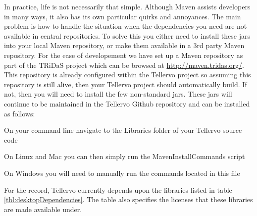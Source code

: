 In practice, life is not necessarily that simple.  Although Maven assists developers in many ways, it also has its own particular quirks and annoyances.  The main problem is how to handle the situation when the dependencies you need are not available in central repositories.  To solve this you either need to install these jars into your local Maven repository, or make them available in a 3rd party Maven repository.  For the ease of developement we have set up a Maven repository as part of the TRiDaS project which can be browsed at \url{http://maven.tridas.org/}.  This repository is already configured within the Tellervo project so assuming this repository is still alive, then your Tellervo project should automatically build.  If not, then you will need to install the few non-standard jars.  These jars will continue to be maintained in the Tellervo Github repository and can be installed as follows:

\begin{itemize*}
 \item On your command line navigate to the Libraries folder of your Tellervo source code
 \item On Linux and Mac you can then simply run the MavenInstallCommands script
 \item On Windows you will need to manually run the commands located in this file
\end{itemize*}

For the record, Tellervo currently depends upon the libraries listed in table \ref{tbl:desktopDependencies}.  The table also specifies the licenses that these libraries are made available under.


